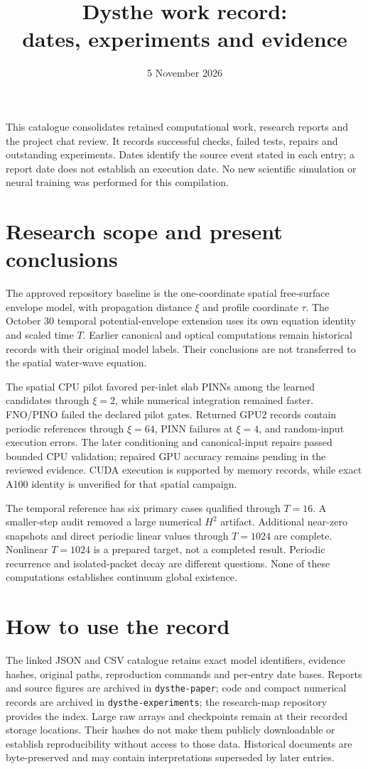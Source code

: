 \documentclass[11pt]{article}
\title{Dysthe work record:\\dates, experiments and evidence}
\author{}\date{5 November 2026}
\begin{document}
\maketitle
\noindent This catalogue consolidates retained computational work, research reports and the project chat review. It records successful checks, failed tests, repairs and outstanding experiments. Dates identify the source event stated in each entry; a report date does not establish an execution date. No new scientific simulation or neural training was performed for this compilation.
\section{Research scope and present conclusions}
The approved repository baseline is the one-coordinate spatial free-surface envelope model, with propagation distance $\xi$ and profile coordinate $\tau$. The October 30 temporal potential-envelope extension uses its own equation identity and scaled time $T$. Earlier canonical and optical computations remain historical records with their original model labels. Their conclusions are not transferred to the spatial water-wave equation.

The spatial CPU pilot favored per-inlet slab PINNs among the learned candidates through $\xi=2$, while numerical integration remained faster. FNO/PINO failed the declared pilot gates. Returned GPU2 records contain periodic references through $\xi=64$, PINN failures at $\xi=4$, and random-input execution errors. The later conditioning and canonical-input repairs passed bounded CPU validation; repaired GPU accuracy remains pending in the reviewed evidence. CUDA execution is supported by memory records, while exact A100 identity is unverified for that spatial campaign.

The temporal reference has six primary cases qualified through $T=16$. A smaller-step audit removed a large numerical $H^2$ artifact. Additional near-zero snapshots and direct periodic linear values through $T=1024$ are complete. Nonlinear $T=1024$ is a prepared target, not a completed result. Periodic recurrence and isolated-packet decay are different questions. None of these computations establishes continuum global existence.

\section{How to use the record}
The linked JSON and CSV catalogue retains exact model identifiers, evidence hashes, original paths, reproduction commands and per-entry date bases. Reports and source figures are archived in \texttt{dysthe-paper}; code and compact numerical records are archived in \texttt{dysthe-experiments}; the research-map repository provides the index. Large raw arrays and checkpoints remain at their recorded storage locations. Their hashes do not make them publicly downloadable or establish reproducibility without access to those data. Historical documents are byte-preserved and may contain interpretations superseded by later entries.
\end{document}
